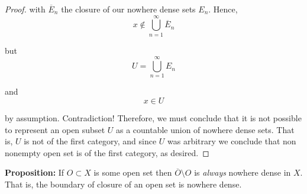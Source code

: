 \documentclass[12pt]{article}
\begin{document}
\begin{proof}
with $\overline{E}_n$ the closure of our nowhere dense sets $E_n$. Hence,
\begin{equation*}
	x \notin \bigcup^\infty_{n = 1} \overline{E}_n
\end{equation*}

but
\begin{equation*}
	U = \bigcup^\infty_{n = 1} E_n
\end{equation*}

and
\begin{equation*}
	x \in U
\end{equation*}

by assumption. Contradiction! Therefore, we must conclude that it is not possible to represent an open subset $U$ as a countable union of nowhere dense sets. That is, $U$ is not of the first category, and since $U$ was arbitrary we conclude that non nonempty open set is of the first category, as desired.
\end{proof}

%
%
{\bf Proposition:} If $O \subset X$ is some open set then $\overline{O}\setminus O$ is {\em always} nowhere dense in $X$. That is, the boundary of closure of an open set is nowhere dense.
\end{document}
